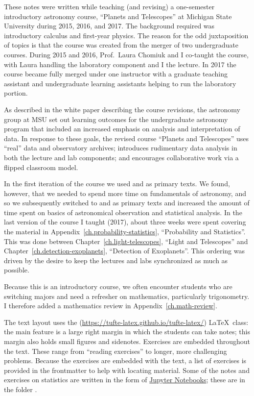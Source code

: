 
These notes were written while teaching (and revising) a one-semester introductory astronomy course, ``Planets and Telescopes'' at Michigan State University during 2015, 2016, and 2017. The background required was  introductory calculus and first-year physics. The reason for the odd juxtaposition of topics is that the course was created from the merger of two undergraduate courses. During 2015 and 2016, Prof.\ Laura Chomiuk and I co-taught the course, with Laura handling the laboratory component and I the lecture. In 2017 the course became fully merged under one instructor with a graduate teaching assistant and undergraduate learning assistants helping to run the laboratory portion.

As described in the white paper describing the course revisions\cite{BrownDevelopment-of-}, the astronomy group at MSU set out learning outcomes for the undergraduate astronomy program that included an increased emphasis on analysis and interpretation of data.
In response to these goals, the revised course ``Planets and Telescopes'' uses ``real'' data and observatory archives; introduces rudimentary data analysis in both the lecture and lab components; and encourages collaborative work via a flipped classroom model.

In the first iteration of the course we used  and  as primary texts. We found, however, that we needed to spend more time on fundamentals of astronomy, and so we subsequently switched to  and  as primary texts and increased the amount of time spent on basics of astronomical observation and statistical analysis. In the last version of the course I taught (2017), about three weeks were spent covering the material in Appendix~\ref{ch.probability-statistics}, ``Probability and Statistics''. This was done between Chapter~\ref{ch.light-telescopes}, ``Light and Telescopes'' and Chapter~\ref{ch.detection-exoplanets}, ``Detection of Exoplanets''.  This ordering was driven by the desire to keep the lectures and labs synchronized as much as possible.

Because this is an introductory course, we often encounter students who are switching majors and need a refresher on mathematics, particularly trigonometry. I therefore added a mathematics review in Appendix~\ref{ch.math-review}.

The text layout uses the  (\url{https://tufte-latex.github.io/tufte-latex/}) \LaTeX\ class:  the main feature is a large right margin in which the students can take notes; this margin also holds small figures and sidenotes. Exercises are embedded throughout the text.  These range from ``reading exercises'' to longer, more challenging problems.  Because the exercises are embedded with the text, a list of exercises is provided in the frontmatter to help with locating material. Some of the notes and exercises on statistics are written in the form of \href{http://jupyter.org}{Jupyter Notebooks}; these are in the folder .

